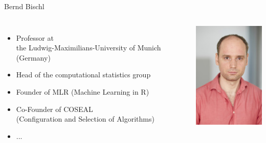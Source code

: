 \begin{frame}[c]{Bernd Bischl}


\begin{columns}
	
	
	\begin{itemize}
		\item Professor at\\ the Ludwig-Maximilians-University of Munich (Germany)
		\item Head of the computational statistics group
		\item Founder of MLR (Machine Learning in R)
		\item Co-Founder of COSEAL\\ (Configuration and Selection of Algorithms)
		\item ...
	\end{itemize}
	
	
	\includegraphics[width=1.0\textwidth]{images/bischl.jpg}
	
\end{columns}

\end{frame}
